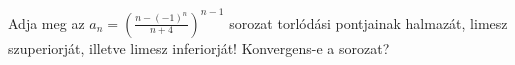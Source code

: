 \documentclass[11pt]{scrartcl}
\begin{document}
Adja meg az
\(\displaystyle
a_n = \left(
\frac{n - (-1)^n}{n + 4}
\right)^{n - 1}
\)
sorozat torlódási pontjainak halmazát, limesz szuperiorját, illetve limesz
inferiorját! Konvergens-e a sorozat?
\end{document}
